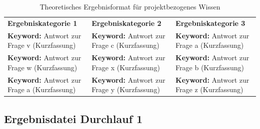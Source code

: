 \documentclass[
  10pt,
  ngerman,
  a4paper,
  toc=graduated,
  numbers=noenddot,
  headings=standardclasses,
  nonumberlist
]{scrartcl}
\begin{document}
\begin{table}[H]
\centering
\begin{tabularx}{\textwidth}{|Y|Y|Y|}
\hline
{}
 \\
\hline
{}
\textbf{Ergebniskategorie 1} 
& \textbf{Ergebniskategorie 2} 
& \textbf{Ergebniskategorie 3} \\
\hline

\textbf{Keyword:} \newline
Antwort zur Frage v \newline
(Kurzfassung)
&
\textbf{Keyword:} \newline
Antwort zur Frage c \newline
(Kurzfassung)
&
\textbf{Keyword:} \newline
Antwort zur Frage a \newline
(Kurzfassung) \\
\hline

\textbf{Keyword:} \newline
Antwort zur Frage w \newline
(Kurzfassung)
&
\textbf{Keyword:} \newline
Antwort zur Frage x \newline
(Kurzfassung)
&
\textbf{Keyword:} \newline
Antwort zur Frage b \newline
(Kurzfassung) \\
\hline

\textbf{Keyword:} \newline
Antwort zur Frage a \newline
(Kurzfassung)
&
\textbf{Keyword:} \newline
Antwort zur Frage y \newline
(Kurzfassung)
&
\textbf{Keyword:} \newline
Antwort zur Frage z \newline
(Kurzfassung) \\
\hline
\end{tabularx}
\caption{Theoretisches Ergebnisformat für projektbezogenes Wissen}
\label{tab:ergebnisformat_projekt}
\end{table}

\newpage
\subsection{Ergebnisdatei Durchlauf 1}
\label{anhang_ergebnisdatei_durchlauf_1}
\end{document}
